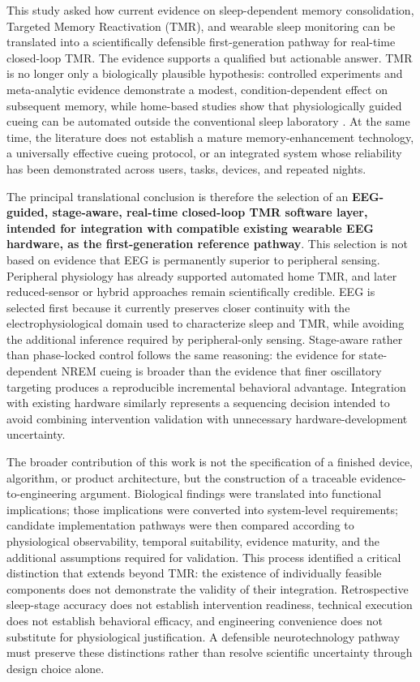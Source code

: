 This study asked how current evidence on sleep-dependent memory consolidation,
Targeted Memory Reactivation (TMR), and wearable sleep monitoring can be
translated into a scientifically defensible first-generation pathway for
real-time closed-loop TMR. The evidence supports a qualified but actionable
answer. TMR is no longer only a biologically plausible hypothesis: controlled
experiments and meta-analytic evidence demonstrate a modest, condition-dependent
effect on subsequent memory, while home-based studies show that physiologically
guided cueing can be automated outside the conventional sleep laboratory
\citep{hu2020promoting,whitmore2022improving,salfi2025promoting}. At the same
time, the literature does not establish a mature memory-enhancement technology,
a universally effective cueing protocol, or an integrated system whose
reliability has been demonstrated across users, tasks, devices, and repeated
nights.

The principal translational conclusion is therefore the selection of an
\textbf{EEG-guided, stage-aware, real-time closed-loop TMR software layer,
intended for integration with compatible existing wearable EEG hardware, as
the first-generation reference pathway}. This selection is not based on evidence
that EEG is permanently superior to peripheral sensing. Peripheral physiology
has already supported automated home TMR, and later reduced-sensor or hybrid
approaches remain scientifically credible. EEG is selected first because it
currently preserves closer continuity with the electrophysiological domain used
to characterize sleep and TMR, while avoiding the additional inference required
by peripheral-only sensing. Stage-aware rather than phase-locked control follows
the same reasoning: the evidence for state-dependent NREM cueing is broader than
the evidence that finer oscillatory targeting produces a reproducible incremental
behavioral advantage. Integration with existing hardware similarly represents a
sequencing decision intended to avoid combining intervention validation with
unnecessary hardware-development uncertainty.

The broader contribution of this work is not the specification of a finished
device, algorithm, or product architecture, but the construction of a traceable
evidence-to-engineering argument. Biological findings were translated into
functional implications; those implications were converted into system-level
requirements; candidate implementation pathways were then compared according to
physiological observability, temporal suitability, evidence maturity, and the
additional assumptions required for validation. This process identified a
critical distinction that extends beyond TMR: the existence of individually
feasible components does not demonstrate the validity of their integration.
Retrospective sleep-stage accuracy does not establish intervention readiness,
technical execution does not establish behavioral efficacy, and engineering
convenience does not substitute for physiological justification. A defensible
neurotechnology pathway must preserve these distinctions rather than resolve
scientific uncertainty through design choice alone.

